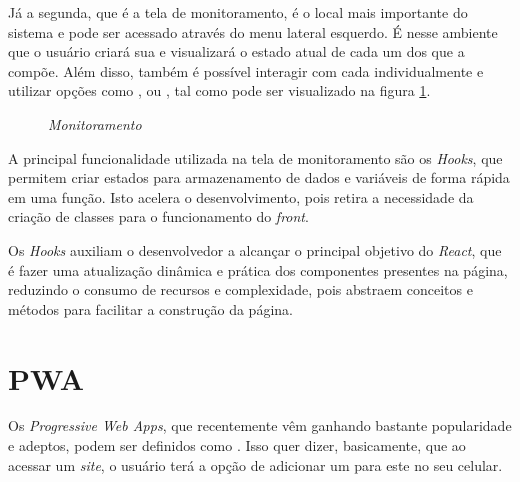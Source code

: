 Já a segunda, que é a tela de monitoramento, é o local mais importante do sistema e pode ser acessado através do menu lateral esquerdo. É nesse ambiente que o usuário criará sua \dockerNetwork{} e visualizará o estado atual de cada um dos \containers{} que a compõe. Além disso, também é possível interagir com cada \conteiner{} individualmente e utilizar opções como ,  ou , tal como pode ser visualizado na figura \ref{fig:monitoramento}.

\begin{figure}[!htb]
    \centering
    \caption{\textit{Monitoramento}}
    \label{fig:monitoramento}
\end{figure}

A principal funcionalidade utilizada na tela de monitoramento são os \textit{Hooks}, que permitem criar estados para armazenamento de dados e variáveis de forma rápida em uma função. Isto acelera o desenvolvimento, pois retira a necessidade da criação de classes para o funcionamento do \textit{front}.

Os \textit{Hooks} auxiliam o desenvolvedor a alcançar o principal objetivo do \textit{React}, que é fazer uma atualização dinâmica e prática dos componentes presentes na página, reduzindo o consumo de recursos e complexidade, pois abstraem conceitos e métodos para facilitar a construção da página.

\section{PWA}
\label{sec:pwa}

Os \textit{Progressive Web Apps}, que recentemente vêm ganhando bastante popularidade e adeptos, podem ser definidos como \cite{Souza19} . Isso quer dizer, basicamente, que ao acessar um \textit{site}, o usuário terá a opção de adicionar um  para este no seu celular.

